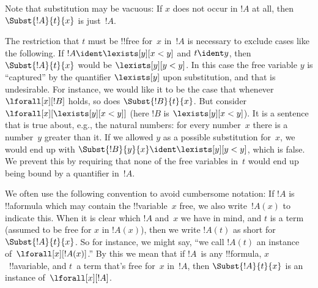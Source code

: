 \documentclass[../../../include/open-logic-section]{subfiles}
\begin{document}
\begin{explain}
Note that substitution may be vacuous: If $x$ does not occur in $!A$
at all, then $\Subst{!A}{t}{x}$ is just~$!A$.

The restriction that $t$ must be !!{free for}~$x$ in~$!A$ is necessary to
exclude cases like the following. If $!A \ident \lexists[y][x < y]$
and $t \ident y$, then $\Subst{!A}{t}{x}$ would be $\lexists[y][y <
  y]$. In this case the free variable $y$ is ``captured'' by the
quantifier $\lexists[y]$ upon substitution, and that is undesirable.
For instance, we would like it to be the case that whenever
$\lforall[x][!B]$ holds, so does $\Subst{!B}{t}{x}$. But consider
$\lforall[x][\lexists[y][x < y]]$ (here $!B$ is $\lexists[y][x <
  y]$). It is a sentence that is true about, e.g., the natural numbers:
for every number~$x$ there is a number~$y$ greater than it. If we
allowed $y$ as a possible substitution for~$x$, we would end up with
$\Subst{!B}{y}{x} \ident \lexists[y][y < y]$, which is false. We
prevent this by requiring that none of the free variables in~$t$ would
end up being bound by a quantifier in~$!A$.
\end{explain}

We often use the following convention to avoid cumbersome notation: If
$!A$ is !!a{formula} which may contain the !!{variable}~$x$ free, we
also write~$!A(x)$ to indicate this. When it is clear which $!A$
and~$x$ we have in mind, and $t$ is a term (assumed to be free for $x$
in $!A(x)$), then we write $!A(t)$ as short for $\Subst{!A}{t}{x}$. So
for instance, we might say, ``we call $!A(t)$ an instance
of~$\lforall[x][!A(x)]$.'' By this we mean that if $!A$~is any
!!{formula}, $x$~!!a{variable}, and $t$~a term that's free for~$x$
in~$!A$, then $\Subst{!A}{t}{x}$ is an instance of~$\lforall[x][!A]$.
\end{document}
